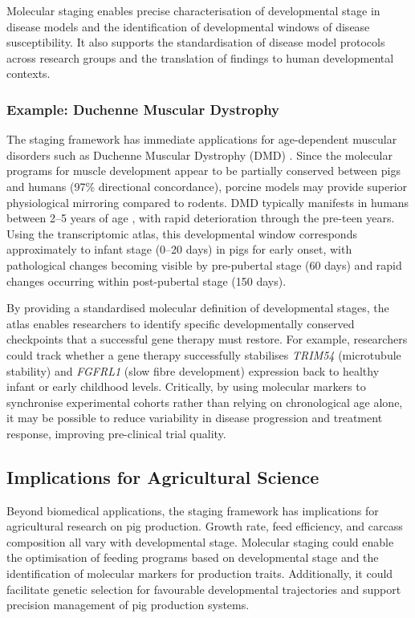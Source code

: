 Molecular staging enables precise characterisation of developmental stage in disease models and the identification of developmental windows of disease susceptibility. It also supports the standardisation of disease model protocols across research groups and the translation of findings to human developmental contexts.

\subsubsection{Example: Duchenne Muscular Dystrophy}

The staging framework has immediate applications for age-dependent muscular disorders such as Duchenne Muscular Dystrophy (DMD) \parencite{klymiuk_dystrophin-deficient_2013, selsby_porcine_2015}. Since the molecular programs for muscle development appear to be partially conserved between pigs and humans (97\% directional concordance), porcine models may provide superior physiological mirroring compared to rodents. DMD typically manifests in humans between 2--5 years of age \parencite{bushby_diagnosis_2010}, with rapid deterioration through the pre-teen years. Using the transcriptomic atlas, this developmental window corresponds approximately to infant stage (0--20 days) in pigs for early onset, with pathological changes becoming visible by pre-pubertal stage (60 days) and rapid changes occurring within post-pubertal stage (150 days).

By providing a standardised molecular definition of developmental stages, the atlas enables researchers to identify specific developmentally conserved checkpoints that a successful gene therapy must restore. For example, researchers could track whether a gene therapy successfully stabilises \textit{TRIM54} (microtubule stability) and \textit{FGFRL1} (slow fibre development) expression back to healthy infant or early childhood levels. Critically, by using molecular markers to synchronise experimental cohorts rather than relying on chronological age alone, it may be possible to reduce variability in disease progression and treatment response, improving pre-clinical trial quality.

\subsection{Implications for Agricultural Science}

Beyond biomedical applications, the staging framework has implications for agricultural research on pig production. Growth rate, feed efficiency, and carcass composition all vary with developmental stage. Molecular staging could enable the optimisation of feeding programs based on developmental stage and the identification of molecular markers for production traits. Additionally, it could facilitate genetic selection for favourable developmental trajectories and support precision management of pig production systems.


